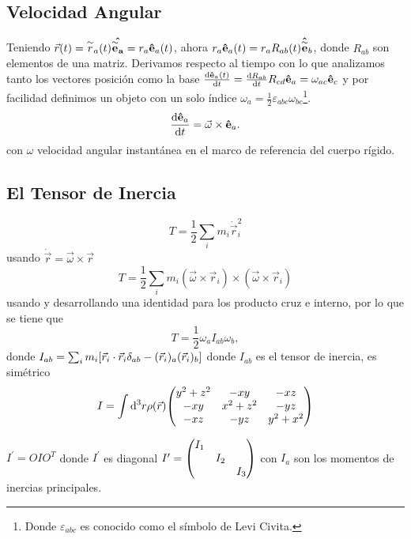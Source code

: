 \subsection{Velocidad Angular}
Teniendo $\vec{r} (t) = \overset{\sim}{r} _a (t) \vu{\overset{\sim}{e}_a} = r_a \vu{e} _a (t)$, ahora $r_a \vu{e} _a (t) = r_a R_{ab} (t) \vu{\overset{\sim}{e}} _b$, donde $R_{ab}$ son elementos de una matriz. Derivamos respecto al tiempo con lo que analizamos tanto los vectores posición como la base $\dv{\vu{e}_a (t)}{t} = \dv{R_{ab}}{t} R_{cd} \vu{e}_a = \omega _{ac} \vu{e}_c$ y por facilidad definimos un objeto con un solo índice $\omega _a = \frac{1}{2} \varepsilon _{abc} \omega _{bc}$\footnote{Donde $\varepsilon _{abc}$ es conocido como el símbolo de Levi Civita.}.
\begin{equation}
	\dv{\vu{e}_a}{t} = \vec{\omega} \times \vu{e}_a.
\end{equation}
con $\omega$ velocidad angular instantánea en el marco de referencia del cuerpo rígido.



\subsection{El Tensor de Inercia}
\begin{equation}
	T = \frac{1}{2} \sum _i m_i \dot{\vec{r}}_i ^2
\end{equation}
usando $\dot{\vec{r}} = \vec{\omega} \times \vec{r}$
\begin{equation}
	T = \frac{1}{2} \sum _i m_i (\vec{\omega} \times \vec{r}_i) \times (\vec{\omega} \times \vec{r} _i)
\end{equation}
usando y desarrollando una identidad para los producto cruz e interno, por lo que se tiene que
\begin{equation}
	T = \frac{1}{2} \omega _a I_{ab} \omega _b,
\end{equation}
donde $I_{ab} = \sum_i m_i \qty[\vec{r}_i \cdot \vec{r}_i \delta _{ab} - (\vec{r}_i)_a (\vec{r}_i)_b]$ donde $I_{ab}$ es el tensor de inercia, es simétrico
\begin{equation}
	I = \int \dd ^3 r \rho (\vec{r}) \mqty( y^2 + z^2 & -xy & -xz \\ -xy & x^2 + z^2 & -yz \\ -xz & -yz & y^2 + x^2 )
\end{equation}

$I^\prime = OIO^T$ donde $I^\prime$ es diagonal $I^\prime = \mqty(\dmat{I_1,I_2,I_3})$ con $I_a$ son los momentos de inercias principales.

